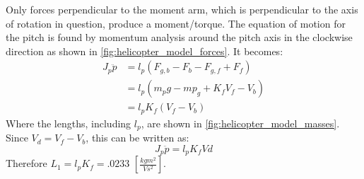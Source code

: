%
Only forces perpendicular to the moment arm, which is
perpendicular to the axis of rotation in question, produce a
moment/torque. The equation of motion for the pitch is found by
momentum analysis around the pitch axis in the clockwise direction as
shown in \cref{fig:helicopter_model_forces}. It becomes:
%
\begin{align*}
  J_p\ddot{p} &= l_p(F_{g,b} - F_b - F_{g,f} + F_f) \\
              &= l_p(m_pg - mp_g + K_fV_f - V_b) \\
              &= l_pK_f(V_f-V_b)
\end{align*}
%
Where the lengths, including $l_p$, are shown in
\cref{fig:helicopter_model_masses}. Since $V_d = V_f-V_b$, this can be
written as:
%
\begin{equation}
  \label{eq:pitch EoM}
  J_p\ddot{p} = l_pK_fVd
\end{equation}
Therefore $L_1 = l_pK_f = .0233$ $[\frac{kgm^2}{Vs^2}]$.

